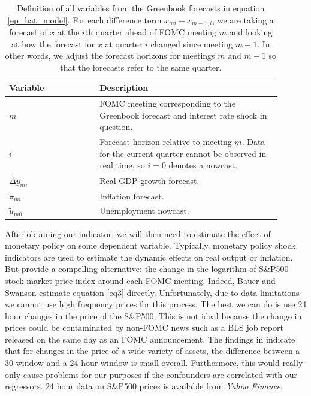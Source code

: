 \documentclass[a4paper,man,floatsintext,natbib]{apa6}
\begin{document}
	\begin{table}[ht]
		\centering
		\begin{tabular}{p{0.30\linewidth}  p{0.6\linewidth}}
			\toprule
			Variable & Description \\ 
			\midrule  
			\(m\) & FOMC meeting corresponding to the Greenbook forecast and interest rate shock in question. \\
			\(i\) & Forecast horizon relative to meeting \(m\). Data for the current quarter cannot be observed in real time, so \(i=0\) denotes a nowcast. \\
			\(\widetilde{\Delta y}_{mi}\) &  Real GDP growth forecast.\\
			\(\tilde{\pi}_{mi}\)& Inflation forecast.\\
			\(\tilde{u}_{m0}\) & Unemployment nowcast. \\
			\bottomrule
		\end{tabular}
		\caption{Definition of all variables from the Greenbook forecasts in equation \ref{ep_hat_model}. For each difference term \(x_{mi}-x_{m-1,i}\), we are taking a forecast of \(x\) at the \(i\)th quarter ahead of FOMC meeting \(m\) and looking at how the forecast for \(x\) at quarter \(i\) changed since meeting \(m-1\). In other words, we adjust the forecast horizons for meetings \(m\) and \(m-1\) so that the forecasts refer to the same quarter.}
		\label{gbvars}
	\end{table}
	
	After obtaining our indicator, we will then need to estimate the effect of monetary policy on some dependent variable. Typically, monetary policy shock indicators are used to estimate the dynamic effects on real output or inflation. But \cite{Bauer2020} provide a compelling alternative: the change in the logarithm of S\&P500 stock market price index around each FOMC meeting. Indeed, Bauer and Swanson estimate equation \ref{eq3} directly. Unfortunately, due to data limitations we cannot use high frequency prices for this process. The best we can do is use 24 hour changes in the price of the S\&P500. This is not ideal because the change in prices could be contaminated by non-FOMC news such as a BLS job report released on the same day as an FOMC announcement. The findings in \cite{Gurkaynak2011} indicate that for changes in the price of a wide variety of assets, the difference between a 30 window and a 24 hour window is small overall. Furthermore, this would really only cause problems for our purposes if the confounders are correlated with our regressors. 24 hour data on S\&P500 prices is available from \textit{Yahoo Finance}. 
\end{document}
